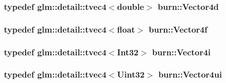 \hypertarget{namespaceburn_a7ef12007621667d3630580a881b8b924}{
\subsubsection[{Vector4d}]{\setlength{\rightskip}{0pt plus 5cm}typedef glm\-::detail\-::tvec4$<$double$>$ {\bf burn\-::\-Vector4d}}}\label{namespaceburn_a7ef12007621667d3630580a881b8b924}
\hypertarget{namespaceburn_a58a411b9d83c7970518a9250c1c78068}{
\subsubsection[{Vector4f}]{\setlength{\rightskip}{0pt plus 5cm}typedef glm\-::detail\-::tvec4$<$float$>$ {\bf burn\-::\-Vector4f}}}\label{namespaceburn_a58a411b9d83c7970518a9250c1c78068}
\hypertarget{namespaceburn_ab917ea93d648ebd548923c709dba8b9b}{
\subsubsection[{Vector4i}]{\setlength{\rightskip}{0pt plus 5cm}typedef glm\-::detail\-::tvec4$<${\bf Int32}$>$ {\bf burn\-::\-Vector4i}}}\label{namespaceburn_ab917ea93d648ebd548923c709dba8b9b}
\hypertarget{namespaceburn_a93214dd433466ae567a7bb09a8b28b79}{
\subsubsection[{Vector4ui}]{\setlength{\rightskip}{0pt plus 5cm}typedef glm\-::detail\-::tvec4$<${\bf Uint32}$>$ {\bf burn\-::\-Vector4ui}}}\label{namespaceburn_a93214dd433466ae567a7bb09a8b28b79}
